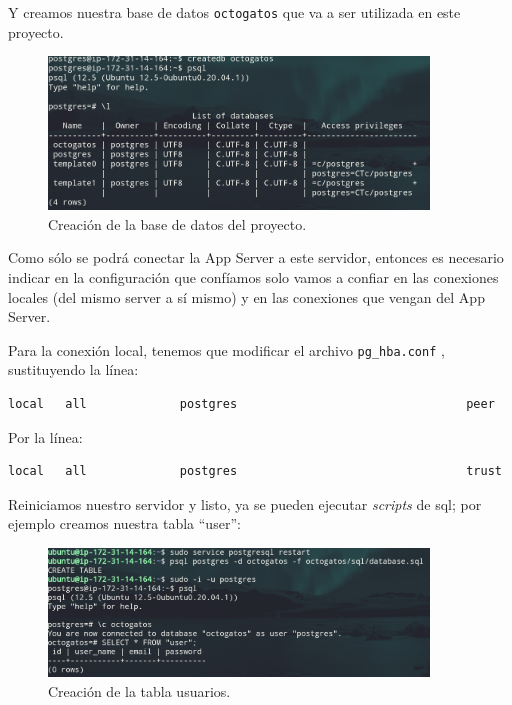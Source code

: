 \documentclass{article}
\newcommand{\ttt}[1]{%
\texttt{#1}%
}
\begin{document}
Y creamos nuestra base de datos \ttt{octogatos} que va a ser
utilizada en este proyecto.

\begin{figure}[H]
  \centering
  \includegraphics[width=0.9\textwidth]{DATASERVER/exhibitC}
  \caption{Creación de la base de datos del proyecto.}
  \label{fig:DATASERVER-C}
\end{figure}

Como sólo se podrá conectar la App Server a este servidor,
entonces es necesario indicar en la configuración que
confíamos solo vamos a confiar en las conexiones locales
(del mismo server a sí mismo) y en las conexiones que vengan
del App Server.

Para la conexión local, tenemos que modificar el archivo
\ttt{pg\_hba.conf}, sustituyendo la línea:

\begin{lstlisting}
local   all             postgres                                peer
\end{lstlisting}

Por la línea:
\begin{lstlisting}
local   all             postgres                                trust
\end{lstlisting}

Reiniciamos nuestro servidor y listo, ya se pueden ejecutar
\textit{scripts} de sql; por ejemplo creamos nuestra tabla
``user'':

\begin{figure}[H]
  \centering
  \includegraphics[width=0.9\textwidth]{DATASERVER/exhibitE}
  \caption{Creación de la tabla usuarios.}
  \label{fig:DATASERVER-E}
\end{figure}
\end{document}
